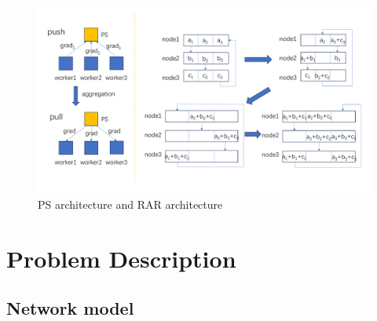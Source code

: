 \documentclass[conference]{IEEEtran}
\begin{document}
\begin{figure}
	\centering
	\includegraphics[width=1\linewidth]{figure/picture5}
	\caption{PS architecture and RAR architecture}
	\label{fig:picture5}
\end{figure}
\section{Problem Description}

\subsection{Network model}

\end{document}
